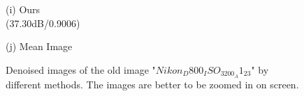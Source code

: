 \documentclass[10pt,twocolumn,letterpaper]{article}
\begin{document}
\begin{figure}
{\begin{minipage}[t]{0.2\textwidth}
{\footnotesize (i) Ours \\  (37.30dB/0.9006)   }
\end{minipage}
\begin{minipage}[t]{0.2\textwidth}
\centering
{}
{\footnotesize (j) Mean Image }
\end{minipage}
}
\caption{Denoised images of the old image "$Nikon_D800_ISO_3200_A1_23$" by different methods. The images are better to be zoomed in on screen.}
\label{fig2}
\end{figure}
\end{document}
